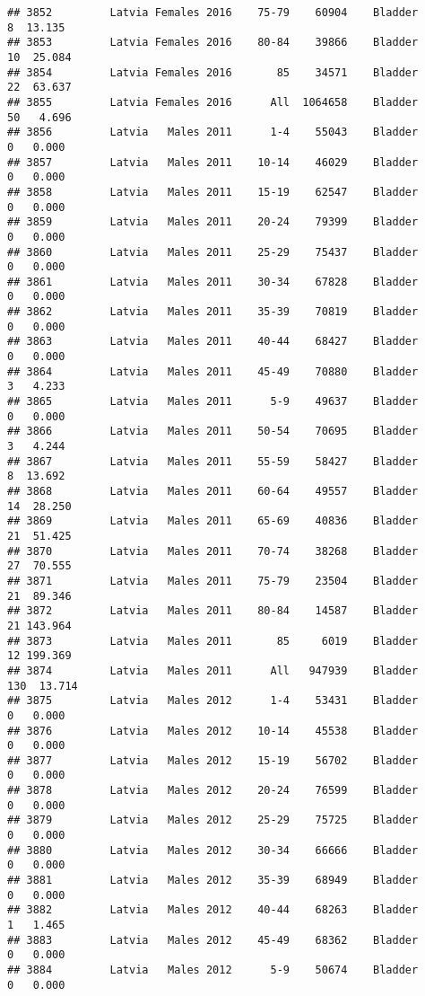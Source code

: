 \documentclass[
]{article}
\begin{document}
\begin{verbatim}
## 3852         Latvia Females 2016    75-79    60904    Bladder      8  13.135
## 3853         Latvia Females 2016    80-84    39866    Bladder     10  25.084
## 3854         Latvia Females 2016       85    34571    Bladder     22  63.637
## 3855         Latvia Females 2016      All  1064658    Bladder     50   4.696
## 3856         Latvia   Males 2011      1-4    55043    Bladder      0   0.000
## 3857         Latvia   Males 2011    10-14    46029    Bladder      0   0.000
## 3858         Latvia   Males 2011    15-19    62547    Bladder      0   0.000
## 3859         Latvia   Males 2011    20-24    79399    Bladder      0   0.000
## 3860         Latvia   Males 2011    25-29    75437    Bladder      0   0.000
## 3861         Latvia   Males 2011    30-34    67828    Bladder      0   0.000
## 3862         Latvia   Males 2011    35-39    70819    Bladder      0   0.000
## 3863         Latvia   Males 2011    40-44    68427    Bladder      0   0.000
## 3864         Latvia   Males 2011    45-49    70880    Bladder      3   4.233
## 3865         Latvia   Males 2011      5-9    49637    Bladder      0   0.000
## 3866         Latvia   Males 2011    50-54    70695    Bladder      3   4.244
## 3867         Latvia   Males 2011    55-59    58427    Bladder      8  13.692
## 3868         Latvia   Males 2011    60-64    49557    Bladder     14  28.250
## 3869         Latvia   Males 2011    65-69    40836    Bladder     21  51.425
## 3870         Latvia   Males 2011    70-74    38268    Bladder     27  70.555
## 3871         Latvia   Males 2011    75-79    23504    Bladder     21  89.346
## 3872         Latvia   Males 2011    80-84    14587    Bladder     21 143.964
## 3873         Latvia   Males 2011       85     6019    Bladder     12 199.369
## 3874         Latvia   Males 2011      All   947939    Bladder    130  13.714
## 3875         Latvia   Males 2012      1-4    53431    Bladder      0   0.000
## 3876         Latvia   Males 2012    10-14    45538    Bladder      0   0.000
## 3877         Latvia   Males 2012    15-19    56702    Bladder      0   0.000
## 3878         Latvia   Males 2012    20-24    76599    Bladder      0   0.000
## 3879         Latvia   Males 2012    25-29    75725    Bladder      0   0.000
## 3880         Latvia   Males 2012    30-34    66666    Bladder      0   0.000
## 3881         Latvia   Males 2012    35-39    68949    Bladder      0   0.000
## 3882         Latvia   Males 2012    40-44    68263    Bladder      1   1.465
## 3883         Latvia   Males 2012    45-49    68362    Bladder      0   0.000
## 3884         Latvia   Males 2012      5-9    50674    Bladder      0   0.000

\end{verbatim}
\end{document}
